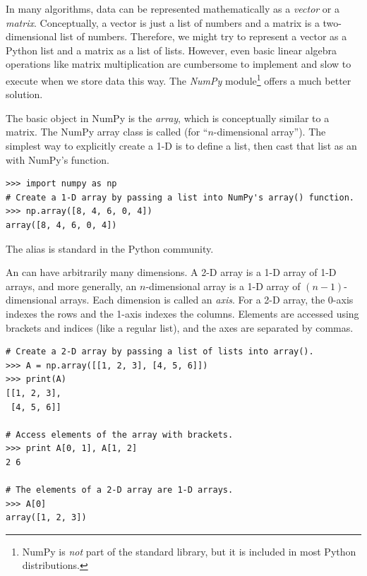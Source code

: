 In many algorithms, data can be represented mathematically as a \emph{vector} or a \emph{matrix}.
Conceptually, a vector is just a list of numbers and a matrix is a two-dimensional list of numbers.
Therefore, we might try to represent a vector as a Python list and a matrix as a list of lists.
However, even basic linear algebra operations like matrix multiplication are cumbersome to implement and slow to execute when we store data this way.
The \emph{NumPy} module\footnote{NumPy is \emph{not} part of the standard library, but it is included in most Python distributions.} offers a much better solution.

The basic object in NumPy is the \emph{array}, which is conceptually similar to a matrix.
The NumPy array class is called  (for ``$n$-dimensional array'').
The simplest way to explicitly create a 1-D  is to define a list, then cast that list as an  with NumPy's  function.

\begin{lstlisting}
>>> import numpy as np
# Create a 1-D array by passing a list into NumPy's array() function.
>>> np.array([8, 4, 6, 0, 4])
array([8, 4, 6, 0, 4])
\end{lstlisting}
The alias  is standard in the Python community.

An  can have arbitrarily many dimensions.
A 2-D array is a 1-D array of 1-D arrays, and more generally, an $n$-dimensional array is a 1-D array of $(n-1)$-dimensional arrays.
Each dimension is called an \emph{axis}.
For a 2-D array, the 0-axis indexes the rows and the 1-axis indexes the columns.
Elements are accessed using brackets and indices (like a regular list), and the axes are separated by commas.

\begin{lstlisting}
# Create a 2-D array by passing a list of lists into array().
>>> A = np.array([[1, 2, 3], [4, 5, 6]])
>>> print(A)
[[1, 2, 3],
 [4, 5, 6]]

# Access elements of the array with brackets.
>>> print A[0, 1], A[1, 2]
2 6

# The elements of a 2-D array are 1-D arrays.
>>> A[0]
array([1, 2, 3])
\end{lstlisting}

